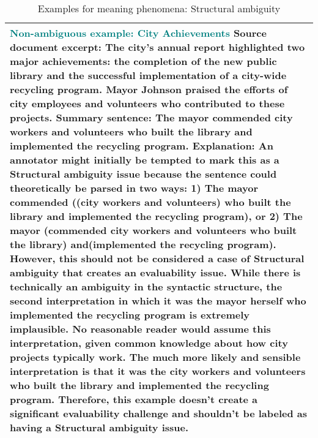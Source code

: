 \begin{table*}
\begin{tabular}{@{}p{14cm}@{}}
    \\ 
\midrule
\textbf{\textcolor{teal}{Non-ambiguous example: City Achievements}}
\newline
\textbf{Source document excerpt:}
The city’s annual report highlighted two major achievements: the completion of the new public library and the successful implementation of a city-wide recycling program. Mayor Johnson praised the efforts of city employees and volunteers who contributed to these projects.
\newline
\textbf{Summary sentence:}
The mayor commended city workers and volunteers who built the library and implemented the recycling program.
\newline
\textbf{Explanation:}
An annotator might initially be tempted to mark this as a Structural ambiguity issue because the sentence could theoretically be parsed in two ways: 1) The mayor commended ((city workers and volunteers) who built the library and implemented the recycling program), or 2) The mayor (commended city workers and volunteers who built the library) and(implemented the recycling program). However, this should not be considered a case of Structural ambiguity that creates an evaluability issue. While there is technically an ambiguity in the syntactic structure, the second interpretation in which it was the mayor herself who implemented the recycling program is extremely implausible. No reasonable reader would assume this interpretation, given common knowledge about how city projects typically work. The much more likely and sensible interpretation is that it was the city workers and volunteers who built the library and implemented the recycling program. Therefore, this example doesn’t create a significant evaluability challenge and shouldn’t be labeled as having a Structural ambiguity issue.
    \\ 
 \bottomrule
\end{tabular}
\caption{Examples for meaning phenomena: Structural ambiguity}
\label{tab:structural_example}
\end{table*}